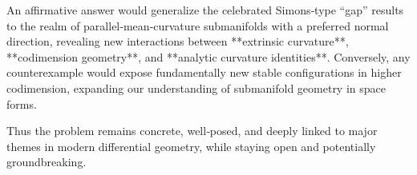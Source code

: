An affirmative answer would generalize the celebrated Simons‑type “gap” results to the realm of parallel‑mean‑curvature submanifolds with a preferred normal direction, revealing new interactions between **extrinsic curvature**, **codimension geometry**, and **analytic curvature identities**. Conversely, any counterexample would expose fundamentally new stable configurations in higher codimension, expanding our understanding of submanifold geometry in space forms.  

Thus the problem remains concrete, well‑posed, and deeply linked to major themes in modern differential geometry, while staying open and potentially groundbreaking.